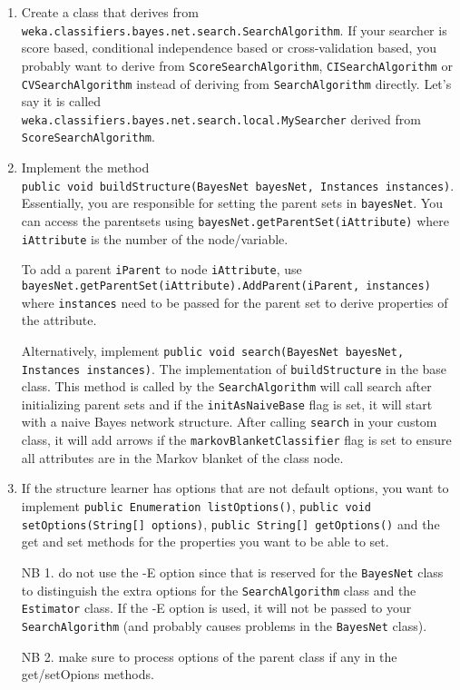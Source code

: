 \begin{enumerate}
\item Create a class that derives from {\tt weka.classifiers.bayes.net.search.SearchAlgorithm}.
  If your searcher is score based, conditional independence based or cross-validation based, you
  probably want to derive from {\tt ScoreSearchAlgorithm}, {\tt CISearchAlgorithm} or {\tt CVSearchAlgorithm}
  instead of deriving from {\tt SearchAlgorithm} directly.
  Let's say it is called \\{\tt weka.classifiers.bayes.net.search.local.MySearcher}
  derived from {\tt ScoreSearchAlgorithm}.

\item Implement the method\\
{\tt public void buildStructure(BayesNet bayesNet, Instances instances)}.
Essentially, you are responsible for setting the parent sets in {\tt bayesNet}.
You can access the parentsets using {\tt bayesNet.getParentSet(iAttribute)} where
{\tt iAttribute} is the number of the node/variable.

To add a parent {\tt iParent} to node {\tt iAttribute}, use\\ 
{\tt bayesNet.getParentSet(iAttribute).AddParent(iParent, instances)} where
{\tt instances} need to be passed for the parent set to derive properties of
the attribute.

Alternatively, implement
{\tt public void search(BayesNet bayesNet, Instances instances)}.
The implementation of {\tt buildStructure} in the base class.
This method is called by the {\tt SearchAlgorithm} will call search
after initializing parent sets and if the {\tt initAsNaiveBase} flag is set, it will
start with a naive Bayes network structure. After calling {\tt search} in your
custom class, it will add arrows if the {\tt markovBlanketClassifier} flag is 
set to ensure all attributes are in the Markov blanket of the class node.

\item If the structure learner has options that are not default options,
you want to implement {\tt public Enumeration listOptions()}, 
{\tt public void setOptions(String[] options)}, 
{\tt public String[] getOptions()} and the get and set methods for
the properties you want to be able to set.

NB 1. do not use the -E option since that is reserved for the {\tt BayesNet} class to 
distinguish the extra options for the {\tt SearchAlgorithm} class and the {\tt Estimator} class.
If the -E option is used, it will not be passed to your {\tt SearchAlgorithm} (and
probably causes problems in the {\tt BayesNet} class).

NB 2. make sure to process options of the parent class if any in the get/setOpions
methods.
\end{enumerate}

